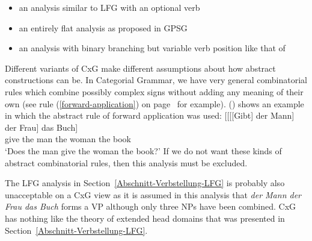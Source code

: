 \begin{itemize}
\item an analysis similar to LFG with an optional verb
\item an entirely flat analysis as proposed in GPSG
\item an analysis with binary branching but variable verb position like that of \citet[]{Steedman2000a-u}
\end{itemize}
%
Different variants of CxG make different assumptions about how abstract constructions can be.
In Categorial Grammar, we have very general combinatorial rules which combine possibly complex signs without adding any meaning
of their own (see rule (\ref{forward-application}) on page~\pageref{forward-application} for
example). () shows an example in which the abstract rule of forward application was used:
\ea
\gll {}[[[[Gibt] der Mann] der Frau] das Buch]\\
	 {}\spacebr{}\spacebr{}\spacebr{}\spacebr{}give the man the woman the book\\
\glt `Does the man give the woman the book?'
\z
If we do not want these kinds of abstract combinatorial rules, then this analysis must be excluded.

The LFG analysis in Section~\ref{Abschnitt-Verbstellung-LFG} is probably also unacceptable on a CxG view as it is assumed in this analysis
that \emph{der Mann der Frau das Buch} forms a VP although only three NPs have been combined. CxG
has nothing like the theory of extended head domains that was presented in Section~\ref{Abschnitt-Verbstellung-LFG}.

